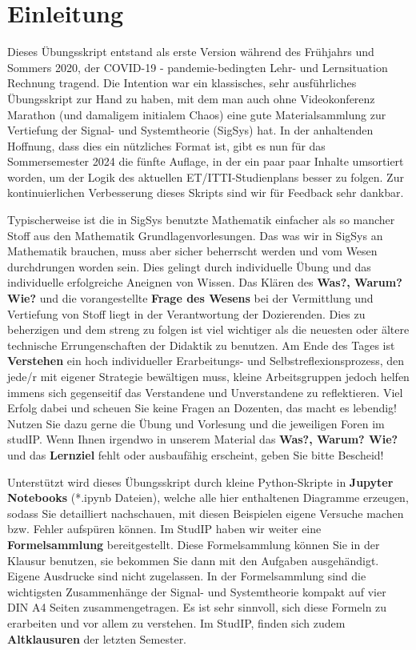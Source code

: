 \newpage
\section*{Einleitung}
%

Dieses Übungsskript entstand als erste Version während des Frühjahrs und Sommers 2020, der
COVID-19 - pandemie-bedingten Lehr- und Lernsituation Rechnung tragend.
%
Die Intention war ein klassisches, sehr ausführliches Übungsskript zur Hand zu haben,
mit dem man auch ohne Videokonferenz Marathon (und damaligem initialem Chaos)
eine gute Materialsammlung zur Vertiefung der Signal- und Systemtheorie (SigSys)
hat.
%
In der anhaltenden Hoffnung, dass dies ein nützliches Format ist, gibt es nun
für das Sommersemester 2024 die fünfte Auflage, in der ein paar paar Inhalte
umsortiert worden, um der Logik des aktuellen ET/ITTI-Studienplans besser zu folgen.
%
Zur kontinuierlichen Verbesserung dieses Skripts sind wir für Feedback sehr dankbar.

Typischerweise ist die in SigSys benutzte Mathematik einfacher als so mancher
Stoff aus den Mathematik Grundlagenvorlesungen.
%
Das was wir in SigSys an Mathematik brauchen, muss aber sicher beherrscht werden
und vom Wesen durchdrungen worden sein.
%
Dies gelingt durch individuelle Übung und das individuelle erfolgreiche Aneignen
von Wissen.
%
Das Klären des \textbf{Was?, Warum? Wie?} und die vorangestellte
\textbf{Frage des Wesens} bei der Vermittlung und Vertiefung von Stoff liegt
in der Verantwortung der Dozierenden.
%
Dies zu beherzigen und dem streng zu folgen ist viel wichtiger als die neuesten
oder ältere technische Errungenschaften der Didaktik zu benutzen.
%
Am Ende des Tages ist \textbf{Verstehen} ein hoch individueller Erarbeitungs-
und Selbstreflexionsprozess, den jede/r mit eigener Strategie bewältigen muss,
kleine Arbeitsgruppen jedoch helfen immens sich gegenseitif das Verstandene und
Unverstandene zu reflektieren.
%
Viel Erfolg dabei und scheuen Sie keine Fragen an Dozenten, das macht es lebendig!
Nutzen Sie dazu gerne die Übung und Vorlesung und die
jeweiligen Foren im studIP.
%
Wenn Ihnen irgendwo in unserem Material das \textbf{Was?, Warum? Wie?} und das
\textbf{Lernziel} fehlt oder ausbaufähig erscheint, geben Sie bitte Bescheid!

%
Unterstützt wird dieses Übungsskript durch kleine Python-Skripte in
\textbf{Jupyter Notebooks} (*.ipynb Dateien),
welche alle hier enthaltenen Diagramme erzeugen, sodass Sie
detailliert nachschauen, mit diesen Beispielen eigene Versuche machen
bzw. Fehler aufspüren können.
%
Im StudIP haben wir weiter eine \textbf{Formelsammlung} bereitgestellt.
%
Diese Formelsammlung können Sie in der Klausur benutzen, sie bekommen Sie
dann mit den Aufgaben ausgehändigt.
%
Eigene Ausdrucke sind nicht zugelassen.
%
In der Formelsammlung sind die wichtigsten Zusammenhänge der Signal- und
Systemtheorie kompakt auf vier DIN A4 Seiten zusammengetragen.
%
Es ist sehr sinnvoll, sich diese Formeln zu erarbeiten und vor allem zu verstehen.
%
Im StudIP, finden sich zudem \textbf{Altklausuren} der letzten Semester.


